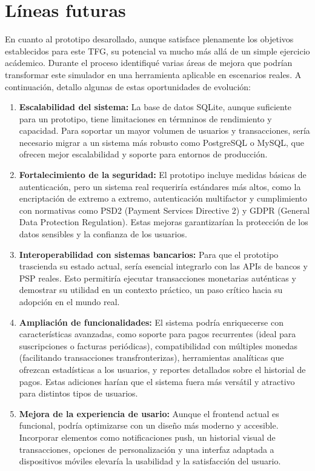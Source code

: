 \newpage
\null
\clearpage
\section{Líneas futuras}
\label{sec:Potencial}
En cuanto al prototipo desarollado, aunque satisface plenamente los objetivos establecidos para este TFG, su potencial va mucho más allá de un simple ejercicio acádemico. Durante el proceso identifiqué varias áreas de mejora que podrían transformar este simulador en una herramienta aplicable en escenarios reales. A continuación, detallo algunas de estas oportunidades de evolución:

\begin{enumerate}
    \item \textbf{Escalabilidad del sistema:} La base de datos SQLite, aunque suficiente para un prototipo, tiene limitaciones en térmninos de rendimiento y capacidad. Para soportar un mayor volumen de usuarios y transacciones, sería necesario migrar a un sistema más robusto como PostgreSQL o MySQL, que ofrecen mejor escalabilidad y soporte para entornos de producción.
    \item \textbf{Fortalecimiento de la seguridad:} El prototipo incluye medidas básicas de autenticación, pero un sistema real requeriría estándares más altos, como la encriptación de extremo a extremo, autenticación multifactor y cumplimiento con normativas como PSD2 (Payment Services Directive 2) y GDPR (General Data Protection Regulation). Estas mejoras garantizarían la protección de los datos sensibles y la confianza de los usuarios.
    \item \textbf{Interoperabilidad con sistemas bancarios:} Para que el prototipo trascienda su estado actual, sería esencial integrarlo con las APIs de bancos y PSP reales. Esto permitiría ejecutar transacciones monetarias auténticas y demostrar su utilidad en un contexto práctico, un paso crítico hacia su adopción en el mundo real.
    \item \textbf{Ampliación de funcionalidades:} El sistema podría enriquecerse con características avanzadas, como soporte para pagos recurrentes (ideal para suscripciones o facturas periódicas), compatibilidad con múltiples monedas (facilitando transacciones transfronterizas), herramientas analíticas que ofrezcan estadísticas a los usuarios, y reportes detallados sobre el historial de pagos. Estas adiciones harían que el sistema fuera más versátil y atractivo para distintos tipos de usuarios.
    \item \textbf{Mejora de la experiencia de usario:} Aunque el frontend actual es funcional, podría optimizarse con un diseño más moderno y accesible. Incorporar elementos como notificaciones push, un historial visual de transacciones, opciones de personalización y una interfaz adaptada a dispositivos móviles elevaría la usabilidad y la satisfacción del usuario.
\end{enumerate}

